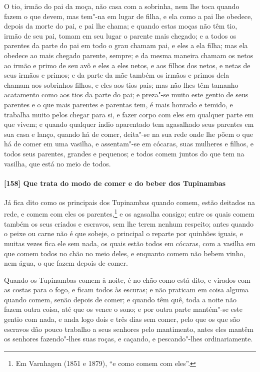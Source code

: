 O tio, irmão do pai da moça, não casa com a sobrinha, nem lhe toca quando fazem o que
devem, mas tem"-na em lugar de filha, e ela como a pai lhe obedece, depois da morte do pai,
e pai lhe chama; e quando estas moças não têm tio, irmão de seu pai, tomam em seu lugar o
parente mais chegado; e a todos os parentes da parte do pai em todo o grau chamam pai, e
eles a ela filha; mas ela obedece ao mais chegado parente, sempre; e da mesma maneira
chamam os netos ao irmão e primo de seu avô e eles a eles netos, e aos filhos dos netos, e
netas de seus irmãos e primos; e da parte da mãe também os irmãos e primos dela chamam aos
sobrinhos filhos, e eles aos tios pais; mas não lhes têm tamanho acatamento como aos tios
da parte do pai; e preza"-se muito este gentio de seus parentes e o que mais parentes e
parentas tem, é mais honrado e temido, e trabalha muito pelos chegar para si, e fazer
corpo com eles em qualquer parte em que vivem; e quando qualquer índio aparentado tem
agasalhado seus parentes em sua casa e lanço, quando há de comer, deita"-se na sua rede
onde lhe põem o que há de comer em uma vasilha, e assentam"-se em cócaras, suas mulheres e
filhos, e todos seus parentes, grandes e pequenos; e todos comem juntos do que tem na
vasilha, que está no meio de todos.

\paragraph{[158] Que trata do modo de comer e do beber dos Tupinambas}\quad
Já fica dito como os principais dos Tupinambas quando comem, estão deitados na rede, e
comem com eles os parentes,\footnote{ Em Varnhagen (1851 e 1879), ``e como comem com
eles''.} e os agasalha consigo; entre os quais comem também os seus criados e escravos,
sem lhe terem nenhum respeito; antes quando o peixe ou carne não é que sobeje, o principal
o reparte por quinhões iguais, e muitas vezes fica ele sem nada, os quais estão todos em
cócaras, com a vasilha em que comem todos no chão no meio deles, e enquanto comem não
bebem vinho, nem água, o que fazem depois de comer.

Quando os Tupinambas comem à noite, é no chão como está dito, e virados com as costas para
o fogo, e ficam todos às escuras; e não praticam em coisa alguma quando comem, senão
depois de comer; e quando têm quê, toda a noite não fazem outra coisa, até que os vence o
sono; e por outra parte mantém"-se este gentio com nada, e anda logo dois e três dias sem
comer, pelo que os que são escravos dão pouco trabalho a seus senhores pelo mantimento,
antes eles mantêm os senhores fazendo"-lhes suas roças, e caçando, e pescando"-lhes
ordinariamente.

